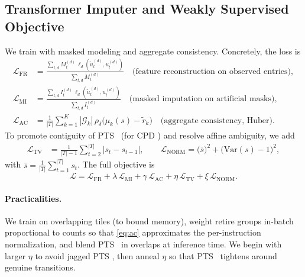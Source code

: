 \documentclass[conference]{IEEEtran}
\newcommand{\Var}{\mathrm{Var}}
\newcommand{\pts}{\textsc{PTS} }
\newcommand{\cpd}{\textsc{CPD} }
\begin{document}
\subsection{Transformer Imputer and Weakly Supervised Objective}
We train with masked modeling and aggregate consistency. Concretely, the loss is
\begin{align}
\mathcal{L}_{\mathrm{FR}} &=\frac{\sum_{t,d}M_t^{(d)}\,\ell_d(\tilde{u}_t^{(d)},u_t^{(d)})}{\sum_{t,d}M_t^{(d)}}
\quad\text{(feature reconstruction on observed entries)}, \nonumber\\
\mathcal{L}_{\mathrm{MI}} &=\frac{\sum_{t,d}I_t^{(d)}\,\ell_d(\tilde{u}_t^{(d)},u_t^{(d)})}{\sum_{t,d}I_t^{(d)}}
\quad\text{(masked imputation on artificial masks)}, \nonumber\\
\mathcal{L}_{\mathrm{AC}} &= \frac{1}{|T|}\sum_{k=1}^K |\mathcal{G}_k|\,\rho_\delta\!\big(\mu_k(s)-\tilde{r}_k\big)
\quad\text{(aggregate consistency, Huber)}. \label{eq:ac}
\end{align}
To promote contiguity of \pts\ (for \cpd) and resolve affine ambiguity, we add
\begin{align}
\mathcal{L}_{\mathrm{TV}} &= \frac{1}{|T|-1}\sum_{t=2}^{|T|} |s_t-s_{t-1}|,
\qquad
\mathcal{L}_{\mathrm{NORM}} = \big(\bar{s}\big)^2+\big(\Var(s)-1\big)^2, \nonumber
\end{align}
with \(\bar{s}=\tfrac{1}{|T|}\sum_{t=1}^{|T|} s_t\).
The full objective is
\begin{equation}
\mathcal{L} =\mathcal{L}_{\mathrm{FR}} + \lambda\,\mathcal{L}_{\mathrm{MI}} + \gamma\,\mathcal{L}_{\mathrm{AC}} + \eta\,\mathcal{L}_{\mathrm{TV}} + \xi\,\mathcal{L}_{\mathrm{NORM}}. \label{eq:full}
\end{equation}

\paragraph{Practicalities.}
We train on overlapping tiles (to bound memory), weight retire groups in-batch proportional to counts so that \eqref{eq:ac} approximates the per-instruction normalization, and blend \pts\ in overlaps at inference time. We begin with larger \(\eta\) to avoid jagged \pts, then anneal \(\eta\) so that \pts\ tightens around genuine transitions.
\end{document}
